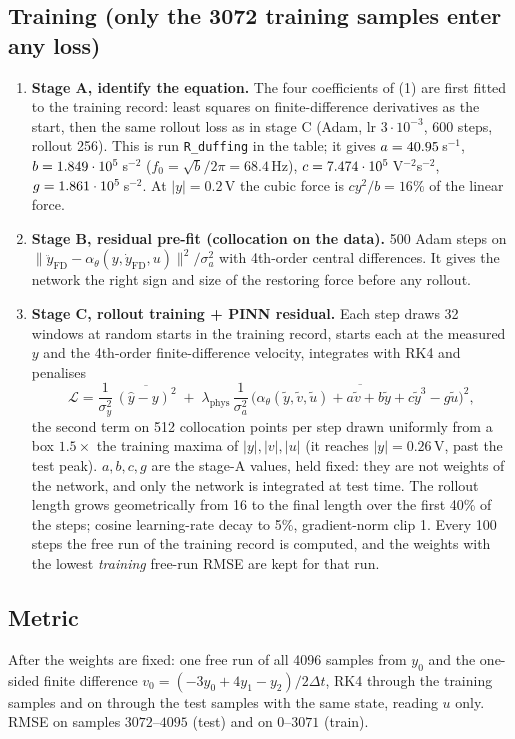 \subsection*{Training (only the 3072 training samples enter any loss)}
\begin{enumerate}[leftmargin=*,itemsep=1pt]
\item \textbf{Stage A, identify the equation.} The four coefficients of (1) are first fitted to the training record: least
squares on finite-difference derivatives as the start, then the same rollout loss as in stage C (Adam, lr $3\cdot10^{-3}$,
600 steps, rollout 256). This is run \texttt{R\_duffing} in the table; it gives
$a=40.95$\,s$^{-1}$, $b=1.849\cdot10^{5}$\,s$^{-2}$ ($f_0=\sqrt b/2\pi=68.4$\,Hz), $c=7.474\cdot10^{5}$\,V$^{-2}$s$^{-2}$, $g=1.861\cdot10^{5}$\,s$^{-2}$.
At $|y|=0.2$\,V the cubic force is $cy^2/b=16\%$ of the linear force.
\item \textbf{Stage B, residual pre-fit (collocation on the data).} 500 Adam steps on
$\|\ddot y_\text{FD}-\alpha_\theta(y,\dot y_\text{FD},u)\|^2/\sigma_a^2$ with 4th-order central differences. It gives the network
the right sign and size of the restoring force before any rollout.
\item \textbf{Stage C, rollout training + PINN residual.} Each step draws 32 windows at random starts in the training record,
starts each at the measured $y$ and the 4th-order finite-difference velocity, integrates with RK4 and penalises
\[
\mathcal L=\frac{1}{\sigma_y^2}\,\overline{(\hat y-y)^2}\;+\;\lambda_\text{phys}\,\frac{1}{\sigma_a^2}\,
\overline{\big(\alpha_\theta(\tilde y,\tilde v,\tilde u)+a\tilde v+b\tilde y+c\tilde y^3-g\tilde u\big)^2},
\]
the second term on 512 collocation points per step drawn uniformly from a box $1.5\times$ the training maxima of $|y|,|v|,|u|$
(it reaches $|y|=0.26$\,V, past the test peak). $a,b,c,g$ are the stage-A values, held fixed: they are not weights of the network,
and only the network is integrated at test time. The rollout length grows geometrically from 16 to the final length over the
first 40\% of the steps; cosine learning-rate decay to 5\%, gradient-norm clip 1. Every 100 steps the free run of the
training record is computed, and the weights with the lowest \emph{training} free-run RMSE are kept for that run.
\end{enumerate}

\subsection*{Metric}
After the weights are fixed: one free run of all 4096 samples from $y_0$ and the one-sided finite difference
$v_0=(-3y_0+4y_1-y_2)/2\Delta t$, RK4 through the training samples and on through the test samples with the same state, reading
$u$ only. RMSE on samples $3072$--$4095$ (test) and on $0$--$3071$ (train).

